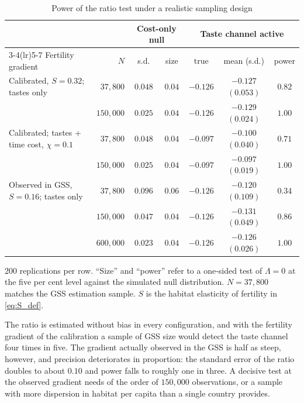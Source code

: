 \documentclass[11pt]{article}
\begin{document}
\begin{table}[h!]\centering
\begin{threeparttable}
\caption{Power of the ratio test under a realistic sampling design}
\label{tab:power}
\footnotesize\setlength{\tabcolsep}{3.5pt}
\begin{tabular}{lrccccc}
\toprule
& & \multicolumn{2}{c}{Cost-only null} & \multicolumn{3}{c}{Taste channel active}\\
\cmidrule(lr){3-4}\cmidrule(lr){5-7}
Fertility gradient & $N$ & s.d. & size & true & mean (s.d.) & power\\
\midrule
Calibrated, $S=0.32$; tastes only          & $37{,}800$  & $0.048$ & $0.04$ & $-0.126$ & $-0.127$ $(0.053)$ & $0.82$\\
                                           & $150{,}000$ & $0.025$ & $0.04$ & $-0.126$ & $-0.129$ $(0.024)$ & $1.00$\\
Calibrated; tastes + time cost, $\chi=0.1$ & $37{,}800$ & $0.048$ & $0.04$ & $-0.097$ & $-0.100$ $(0.040)$ & $0.71$\\
                                           & $150{,}000$ & $0.025$ & $0.04$ & $-0.097$ & $-0.097$ $(0.019)$ & $1.00$\\
Observed in GSS, $S=0.16$; tastes only & $37{,}800$ & $0.096$ & $0.06$ & $-0.126$ & $-0.120$ $(0.109)$ & $0.34$\\
                                           & $150{,}000$ & $0.047$ & $0.04$ & $-0.126$ & $-0.131$ $(0.049)$ & $0.86$\\
                                           & $600{,}000$ & $0.023$ & $0.04$ & $-0.126$ & $-0.126$ $(0.026)$ & $1.00$\\
\bottomrule
\end{tabular}
\begin{tablenotes}\footnotesize
\item 200 replications per row. ``Size'' and ``power'' refer to a one-sided test of $\Lambda=0$ at
the five per cent level against the simulated null distribution. $N=37{,}800$ matches the GSS
estimation sample. $S$ is the habitat elasticity of fertility in \eqref{eq:S_def}.
\end{tablenotes}
\end{threeparttable}
\end{table}

The ratio is estimated without bias in every configuration, and with the fertility gradient of the
calibration a sample of GSS size would detect the taste channel four times in five. The gradient
actually observed in the GSS is half as steep, however, and precision deteriorates in proportion:
the standard error of the ratio doubles to about $0.10$ and power falls to roughly one in three. A
decisive test at the observed gradient needs of the order of $150{,}000$ observations, or a sample
with more dispersion in habitat per capita than a single country provides.
\end{document}
